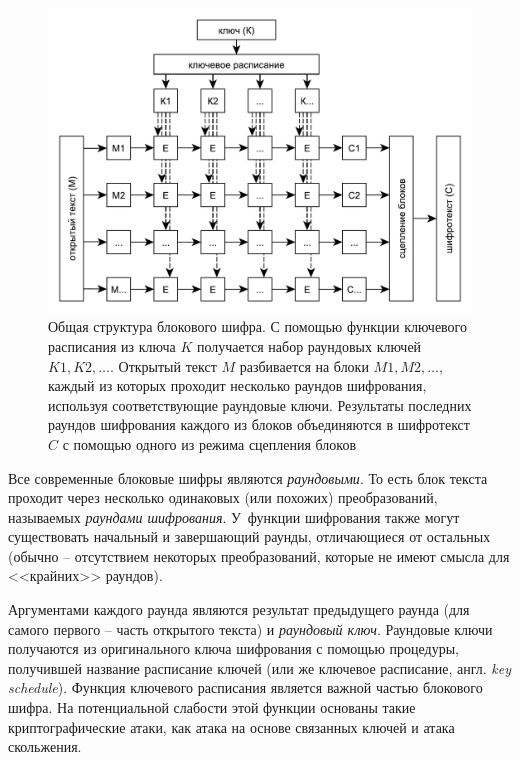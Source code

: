 \begin{figure}[!ht]
	\centering
	\includegraphics[width=1\textwidth]{pic/block-cipher}
  \caption{Общая структура блокового шифра. С помощью функции ключевого расписания из ключа $K$ получается набор раундовых ключей $K1, K2, \dots$. Открытый текст $M$ разбивается на блоки $M1, M2, \dots$, каждый из которых проходит несколько раундов шифрования, используя соответствующие раундовые ключи. Результаты последних раундов шифрования каждого из блоков объединяются в шифротекст $C$ с помощью одного из режима сцепления блоков}
  \label{fig:block-cipher}
\end{figure}

Все современные блоковые шифры являются \textit{раундовыми}. То есть блок текста проходит через несколько одинаковых (или похожих) преобразований, называемых \textit{раундами шифрования}. У~функции шифрования также могут существовать начальный и завершающий раунды, отличающиеся от остальных (обычно -- отсутствием некоторых преобразований, которые не имеют смысла для <<крайних>> раундов).

Аргументами каждого раунда являются результат предыдущего раунда (для самого первого -- часть открытого текста) и \textit{раундовый ключ}. Раундовые ключи получаются из оригинального ключа шифрования с помощью процедуры, получившей название расписание ключей (или же ключевое расписание, англ. \textit{key schedule}). Функция ключевого расписания является важной частью блокового шифра. На потенциальной слабости этой функции основаны такие криптографические атаки, как атака на основе связанных ключей и атака скольжения.

